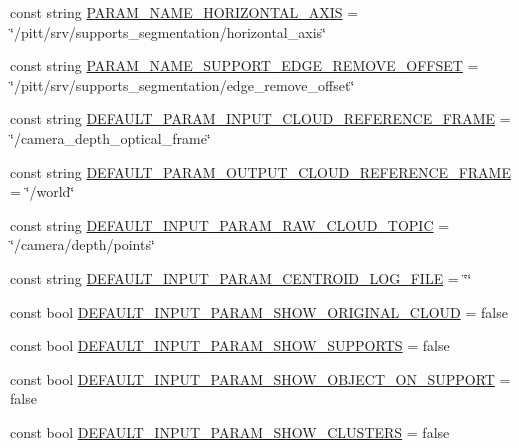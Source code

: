 \begin{DoxyCompactItemize}
\item 
const string \hyperlink{namespacesrvm_a2957bf6ee16944664364c470f1beb958}{P\-A\-R\-A\-M\-\_\-\-N\-A\-M\-E\-\_\-\-H\-O\-R\-I\-Z\-O\-N\-T\-A\-L\-\_\-\-A\-X\-I\-S} = \char`\"{}/pitt/srv/supports\-\_\-segmentation/horizontal\-\_\-axis\char`\"{}
\item 
const string \hyperlink{namespacesrvm_a07211b3f36f93931af6e67097b75f145}{P\-A\-R\-A\-M\-\_\-\-N\-A\-M\-E\-\_\-\-S\-U\-P\-P\-O\-R\-T\-\_\-\-E\-D\-G\-E\-\_\-\-R\-E\-M\-O\-V\-E\-\_\-\-O\-F\-F\-S\-E\-T} = \char`\"{}/pitt/srv/supports\-\_\-segmentation/edge\-\_\-remove\-\_\-offset\char`\"{}
\item 
const string \hyperlink{namespacesrvm_a2c4c31d893bfef55ede38ab56f4e7658}{D\-E\-F\-A\-U\-L\-T\-\_\-\-P\-A\-R\-A\-M\-\_\-\-I\-N\-P\-U\-T\-\_\-\-C\-L\-O\-U\-D\-\_\-\-R\-E\-F\-E\-R\-E\-N\-C\-E\-\_\-\-F\-R\-A\-M\-E} = \char`\"{}/camera\-\_\-depth\-\_\-optical\-\_\-frame\char`\"{}
\item 
const string \hyperlink{namespacesrvm_a228565e6d2ec6f457f78c4412d6c7daa}{D\-E\-F\-A\-U\-L\-T\-\_\-\-P\-A\-R\-A\-M\-\_\-\-O\-U\-T\-P\-U\-T\-\_\-\-C\-L\-O\-U\-D\-\_\-\-R\-E\-F\-E\-R\-E\-N\-C\-E\-\_\-\-F\-R\-A\-M\-E} = \char`\"{}/world\char`\"{}
\item 
const string \hyperlink{namespacesrvm_afb9bab9dced618a8992cf505cf484b1c}{D\-E\-F\-A\-U\-L\-T\-\_\-\-I\-N\-P\-U\-T\-\_\-\-P\-A\-R\-A\-M\-\_\-\-R\-A\-W\-\_\-\-C\-L\-O\-U\-D\-\_\-\-T\-O\-P\-I\-C} = \char`\"{}/camera/depth/points\char`\"{}
\item 
const string \hyperlink{namespacesrvm_a92921b8b79655fa69a697a54dca42056}{D\-E\-F\-A\-U\-L\-T\-\_\-\-I\-N\-P\-U\-T\-\_\-\-P\-A\-R\-A\-M\-\_\-\-C\-E\-N\-T\-R\-O\-I\-D\-\_\-\-L\-O\-G\-\_\-\-F\-I\-L\-E} = \char`\"{}\char`\"{}
\item 
const bool \hyperlink{namespacesrvm_ac54afc31491c977345ef1a1fbb563be3}{D\-E\-F\-A\-U\-L\-T\-\_\-\-I\-N\-P\-U\-T\-\_\-\-P\-A\-R\-A\-M\-\_\-\-S\-H\-O\-W\-\_\-\-O\-R\-I\-G\-I\-N\-A\-L\-\_\-\-C\-L\-O\-U\-D} = false
\item 
const bool \hyperlink{namespacesrvm_a9880144ef0df953c3b583e4f20dbff76}{D\-E\-F\-A\-U\-L\-T\-\_\-\-I\-N\-P\-U\-T\-\_\-\-P\-A\-R\-A\-M\-\_\-\-S\-H\-O\-W\-\_\-\-S\-U\-P\-P\-O\-R\-T\-S} = false
\item 
const bool \hyperlink{namespacesrvm_a8e6760e3e9557fc2fb87cbb6fcd8b3e6}{D\-E\-F\-A\-U\-L\-T\-\_\-\-I\-N\-P\-U\-T\-\_\-\-P\-A\-R\-A\-M\-\_\-\-S\-H\-O\-W\-\_\-\-O\-B\-J\-E\-C\-T\-\_\-\-O\-N\-\_\-\-S\-U\-P\-P\-O\-R\-T} = false
\item 
const bool \hyperlink{namespacesrvm_aef053199a3f95b1da712ef187b096f93}{D\-E\-F\-A\-U\-L\-T\-\_\-\-I\-N\-P\-U\-T\-\_\-\-P\-A\-R\-A\-M\-\_\-\-S\-H\-O\-W\-\_\-\-C\-L\-U\-S\-T\-E\-R\-S} = false

\end{DoxyCompactItemize}

